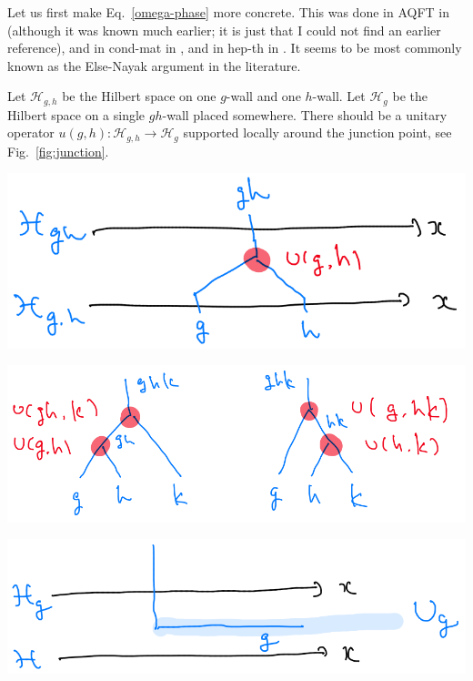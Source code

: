 \documentclass[12pt]{article}
\numberwithin{equation}{section}
\numberwithin{figure}{section}
\theoremstyle{remark}
\renewenvironment{figure}[1][]{
  \begin{originalfigure}[#1]
    \begin{mdframed}[linecolor=black!0,backgroundcolor=black!1]
}{
    \end{mdframed}
  \end{originalfigure}
}
\def\cH{\mathcal{H}}
\begin{document}
Let us first make Eq.~\ref{omega-phase} more concrete. 
This was done in  AQFT in \cite[Sec.~4.2]{Muger:2005ra} (although it was known much earlier;
it is just that I could not find an earlier reference),
and in cond-mat in \cite{Else:2014vma},
and in hep-th in \cite{Seifnashri:2023dpa}.
It seems to be most commonly known as the Else-Nayak argument in the literature.

Let $\cH_{g,h}$ be the Hilbert space on one $g$-wall and one $h$-wall.
Let $\cH_g$ be the Hilbert space on a single $gh$-wall placed somewhere.
There should be a unitary operator 
$u(g,h):\cH_{g,h}\to \cH_{g}$ supported locally around the junction point,
see Fig.~\ref{fig:junction}.

\begin{figure}[h]
\centering
 \includegraphics[scale=.3]{junction.png} 
\caption{Junction unitary $u(g,h)$ of two walls. \label{fig:junction}}
\end{figure}

\begin{figure}[h]
\centering
 \includegraphics[scale=.3]{rearrangement.png} 
\caption{Two ways of combining three walls. \label{fig:rearrangement}}
\end{figure}

\begin{figure}[h]
\centering
 \includegraphics[scale=.3]{half.png} 
\caption{Group transformation on the half-space. \label{fig:half}}
\end{figure}
\end{document}
